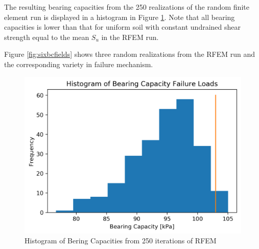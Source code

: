 The resulting bearing capacities from the 250 realizations of the random finite element run is displayed in a histogram in Figure \ref{fig:bc_hist}. Note that all bearing capacities is lower than that for uniform soil with constant undrained shear strength equal to the mean $S_u$ in the RFEM run.

Figure \ref{fig:sixbcfields} shows three random realizations from the RFEM run and the corresponding variety in failure mechanism. 

\begin{figure}[h]
	\includegraphics[width=\textwidth]{fig/bc/nx/bc_histogram20211117-091648}
	\caption{Histogram of Bering Capacities from 250 iterations of RFEM}
	\label{fig:bc_hist}
\end{figure}


